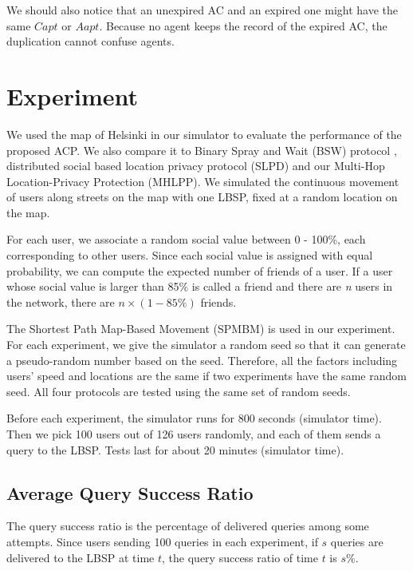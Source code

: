 \documentclass[conference]{IEEEtran}
\begin{document}
We should also notice that an unexpired AC and an expired one might have the same $Capt$ or $Aapt$. Because no agent keeps the record of the expired AC, the duplication cannot confuse agents.


\section{ Experiment}

\noindent We used the map of Helsinki in our simulator to evaluate the performance of the proposed ACP. We also compare it to Binary Spray and Wait (BSW) protocol \cite{C31}, distributed social based location privacy protocol (SLPD) \cite{C16} and our Multi-Hop Location-Privacy Protection (MHLPP). We simulated the continuous movement of users along streets on the map with one LBSP, fixed at a random location on the map.

For each user, we associate a random social value between 0 - 100\%, each corresponding to other users. Since each social value is assigned with equal probability, we can compute the expected number of friends of a user. If a user whose social value is larger than 85\% is called a friend and there are \textit{n} users in the network, there are $n\times \left(1-85\%\right)$ friends.

The Shortest Path Map-Based Movement (SPMBM) \cite{C35} is used in our experiment. For each experiment, we give the simulator a random seed so that it can generate a pseudo-random number based on the seed. Therefore, all the factors including users' speed and locations are the same if two experiments have the same random seed. All four protocols are tested using the same set of random seeds.

Before each experiment, the simulator runs for 800 seconds (simulator time). Then we pick 100 users out of 126 users randomly, and each of them sends a query to the LBSP. Tests last for about 20 minutes (simulator time). 


\subsection{  Average Query Success Ratio}

\noindent The query success ratio is the percentage of delivered queries among some attempts. Since users sending 100 queries in each experiment, if $s$ queries are delivered to the LBSP at time $t$, the query success ratio of time $t$ is $s\%$.
\end{document}
